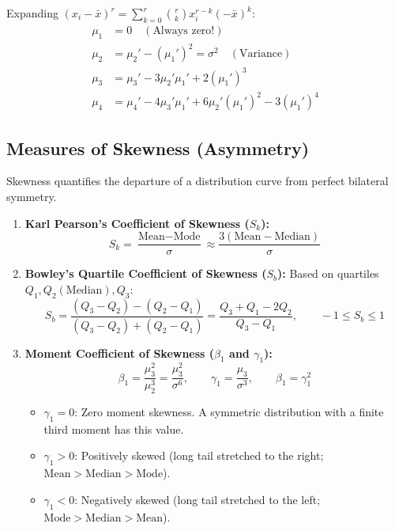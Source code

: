 \documentclass[12pt,a4paper]{article}
\begin{document}
\begin{tcolorbox}[formulabox, title={\textbf{Conversion Relations: Central Moments from Raw Moments}}]
Expanding $(x_i - \bar{x})^r = \sum_{k=0}^r \binom{r}{k} x_i^{r-k} (-\bar{x})^k$:
\begin{align}
  \mu_1 &= 0 \quad (\text{Always zero!}) \\[3pt]
  \mu_2 &= \mu_2' - (\mu_1')^2 = \sigma^2 \quad (\text{Variance}) \\[3pt]
  \mu_3 &= \mu_3' - 3\mu_2'\mu_1' + 2(\mu_1')^3 \\[3pt]
  \mu_4 &= \mu_4' - 4\mu_3'\mu_1' + 6\mu_2'(\mu_1')^2 - 3(\mu_1')^4
\end{align}
\end{tcolorbox}

\subsection{Measures of Skewness (Asymmetry)}
Skewness quantifies the departure of a distribution curve from perfect bilateral symmetry.
\begin{tcolorbox}[defbox, title={\textbf{Formulas for Coefficients of Skewness}}]
\begin{enumerate}[leftmargin=*, itemsep=3pt]
  \item \textbf{Karl Pearson's Coefficient of Skewness ($S_k$):}
  \begin{equation}
    S_k = \frac{\text{Mean} - \text{Mode}}{\sigma} \approx \frac{3(\text{Mean} - \text{Median})}{\sigma}
  \end{equation}
  \item \textbf{Bowley's Quartile Coefficient of Skewness ($S_b$):} Based on quartiles $Q_1, Q_2 (\text{Median}), Q_3$:
  \begin{equation}
    S_b = \frac{(Q_3 - Q_2) - (Q_2 - Q_1)}{(Q_3 - Q_2) + (Q_2 - Q_1)} = \frac{Q_3 + Q_1 - 2Q_2}{Q_3 - Q_1}, \qquad -1 \le S_b \le 1
  \end{equation}
  \item \textbf{Moment Coefficient of Skewness ($\beta_1$ and $\gamma_1$):}
  \begin{equation}
    \beta_1 = \frac{\mu_3^2}{\mu_2^3} = \frac{\mu_3^2}{\sigma^6}, \qquad \gamma_1 = \frac{\mu_3}{\sigma^3}, \qquad \beta_1 = \gamma_1^2
  \end{equation}
  \begin{itemize}[leftmargin=*, itemsep=1pt]
    \item $\gamma_1 = 0$: Zero moment skewness. A symmetric distribution with a finite third moment has this value.
    \item $\gamma_1 > 0$: Positively skewed (long tail stretched to the right; $\text{Mean} > \text{Median} > \text{Mode}$).
    \item $\gamma_1 < 0$: Negatively skewed (long tail stretched to the left; $\text{Mode} > \text{Median} > \text{Mean}$).
  \end{itemize}
\end{enumerate}
\end{tcolorbox}
\end{document}
